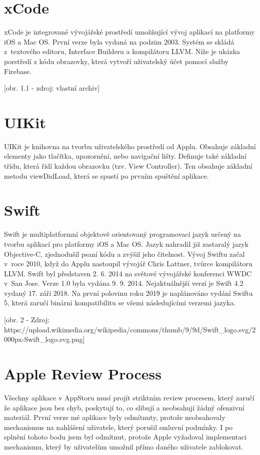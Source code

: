 \documentclass{article}
\begin{document}
\vspace{10 mm}

\section{xCode}
xCode je integrované vývojářské prostředí umožňující vývoj aplikací na platformy iOS a Mac OS. První verze byla vydaná na podzim 2003. Systém se skládá z textového 
editoru, Interface Builderu a kompilátoru LLVM. Níže je ukázka porstředí z kódu obrazovky, která vytvoří uživatelský účet pomocí služby Firebase.

[obr. 1.1 - zdroj: vlastní archiv]
\vspace{10 mm}
\section{UIKit}
UIKit je knihovna na tvorbu uživatelského prostředí od Applu. Obsahuje základní elementy jako tlačítka, upozornění, nebo navigační lišty. Definuje také základní třídu, která řídí každou obrazovku (tzv. View Controller). Ten obsahuje základní metodu viewDidLoad, která se spustí po prvním spuštění aplikace.




\section{Swift}
Swift je multiplatformní objektově orientovaný programovací jazyk určený na tvorbu aplikací pro platformy iOS a Mac OS. Jazyk nahradil již zastaralý jazyk Objective-C, zjednodušil psaní kódu a zvýšil jeho čitelnost. Vývoj Swiftu začal v roce 2010, když do Applu nastoupil vývojář Chris Lattner, tvůrce kompilátoru LLVM. 
Swift byl představen 2. 6. 2014 na světové vývojářské konferenci WWDC v San Jose. Verze 1.0 byla vydána 9. 9. 2014. Nejaktuálnější verzí je Swift 4.2 vydaný 17. září 2018. Na první polovinu roku 2019 je naplánováno vydání Swiftu 5, která zaručí binární kompatibilitu se všemi následujícími verzemi jazyka.
\vspace{10 mm}

[obr. 2 - Zdroj: https://upload.wikimedia.org/wikipedia/commons/thumb/9/9d/Swift_logo.svg/2000px-Swift_logo.svg.png]

\vspace{10 mm}
\section{Apple Review Process}
Všechny aplikace v AppStoru musí projít striktním review procesem, který zaručí že aplikace jsou bez chyb, poskytují to, co slibují a neobsahují žádný ofenzivní materiál. První verze mé aplikace byly odmítnuty, protože neobsahovaly mechanismus na nahlášení uživatele, který porušil smluvní podmínky. I po splnění tohoto bodu jsem byl odmítnut, protože Apple vyžadoval implementaci mechanismu, který by uživatelům umožnil přímo daného uživatele zablokovat. 
\end{document}
